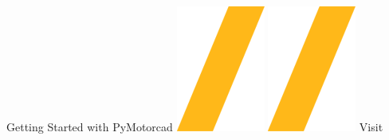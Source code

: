 \documentclass[landscape]{article}
\begin{document}
\vspace{-0.15cm}
\noindent\makebox[\linewidth]{\rule{\paperwidth}{4pt}}
\begin{center}
Getting Started with PyMotorcad \includegraphics[height=\fontcharht\font`\S]{slash.png} \href{https://github.com/ansys/pymotorcad}{\color{blue}{PyMotorcad on GitHub}} \includegraphics[height=\fontcharht\font`\S]{slash.png} Visit 
\end{center}
\end{document}
